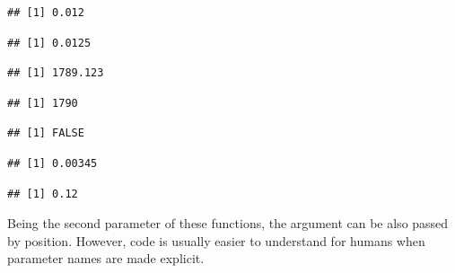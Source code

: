 \documentclass[krantz2]{krantz}\usepackage{knitr}%
\begin{document}
\begin{knitrout}\footnotesize
{}\color{fgcolor}\begin{kframe}
\begin{alltt}
\hlstd{(}\hlstd{,}  \hlstd{=} \hlstd{)}
\end{alltt}
\begin{verbatim}
## [1] 0.012
\end{verbatim}
\begin{alltt}
\hlstd{(}\hlstd{,}  \hlstd{=} \hlstd{)}
\end{alltt}
\begin{verbatim}
## [1] 0.0125
\end{verbatim}
\begin{alltt}
\hlstd{(}\hlstd{,}  \hlstd{=} \hlstd{)}
\end{alltt}
\begin{verbatim}
## [1] 1789.123
\end{verbatim}
\begin{alltt}
\hlstd{(}\hlstd{,}  \hlstd{=} \hlstd{)}
\end{alltt}
\begin{verbatim}
## [1] 1790
\end{verbatim}
\begin{alltt}
 \hlkwb{<-} 
 \hlkwb{<-}   \hlstd{=} \hlstd{)}
 \hlopt{==} 
\end{alltt}
\begin{verbatim}
## [1] FALSE
\end{verbatim}
\begin{alltt}
 \hlopt{-} 
\end{alltt}
\begin{verbatim}
## [1] 0.00345
\end{verbatim}
\begin{alltt}
\end{alltt}
\begin{verbatim}
## [1] 0.12
\end{verbatim}
\end{kframe}
\end{knitrout}

Being  the second parameter of these functions, the argument can be also passed by position. However, code is usually easier to understand for humans when parameter names are made explicit.
\end{document}
